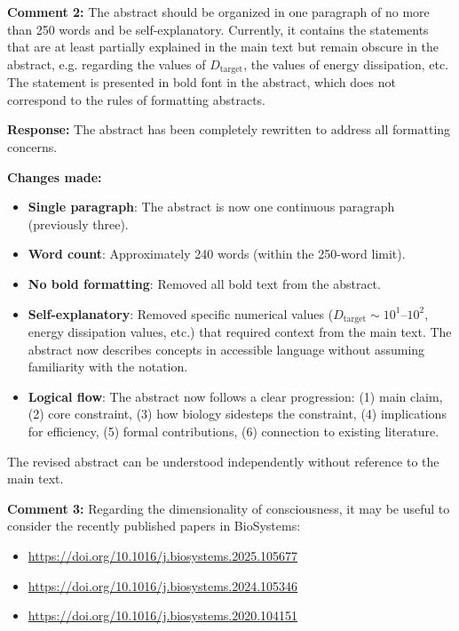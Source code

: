 \documentclass[11pt]{article}
\newcommand{\editor}[1]{\textcolor{editorcolor}{\textbf{#1}}}
\newcommand{\response}{\textcolor{responsecolor}{\textbf{Response: }}}
\begin{document}
\vspace{0.5cm}

\editor{Comment 2:} The abstract should be organized in one paragraph of no more than 250 words and be self-explanatory. Currently, it contains the statements that are at least partially explained in the main text but remain obscure in the abstract, e.g. regarding the values of $D_{\text{target}}$, the values of energy dissipation, etc. The statement is presented in bold font in the abstract, which does not correspond to the rules of formatting abstracts.

\response The abstract has been completely rewritten to address all formatting concerns.

\textbf{Changes made:}
\begin{itemize}
\item \textbf{Single paragraph}: The abstract is now one continuous paragraph (previously three).

\item \textbf{Word count}: Approximately 240 words (within the 250-word limit).

\item \textbf{No bold formatting}: Removed all bold text from the abstract.

\item \textbf{Self-explanatory}: Removed specific numerical values ($D_{\text{target}} \sim 10^1$--$10^2$, energy dissipation values, etc.) that required context from the main text. The abstract now describes concepts in accessible language without assuming familiarity with the notation.

\item \textbf{Logical flow}: The abstract now follows a clear progression: (1) main claim, (2) core constraint, (3) how biology sidesteps the constraint, (4) implications for efficiency, (5) formal contributions, (6) connection to existing literature.
\end{itemize}

The revised abstract can be understood independently without reference to the main text.

\vspace{0.5cm}

\editor{Comment 3:} Regarding the dimensionality of consciousness, it may be useful to consider the recently published papers in BioSystems:
\begin{itemize}
\item \url{https://doi.org/10.1016/j.biosystems.2025.105677}
\item \url{https://doi.org/10.1016/j.biosystems.2024.105346}
\item \url{https://doi.org/10.1016/j.biosystems.2020.104151}
\end{itemize}
\end{document}
